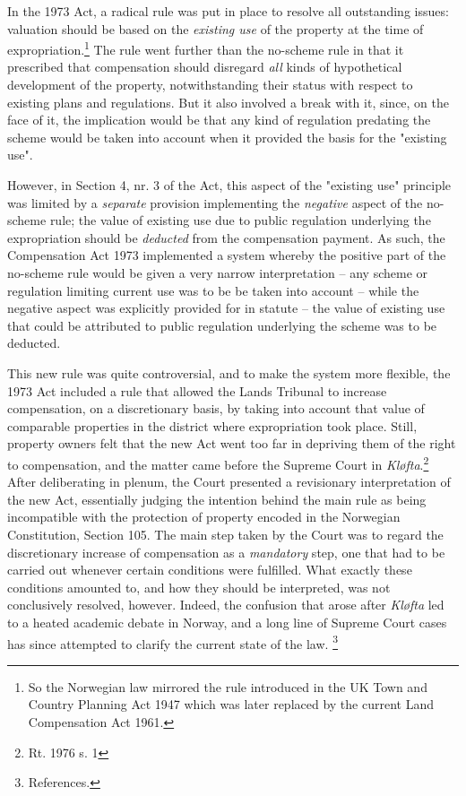 In the 1973 Act, a radical rule was put in place to resolve all outstanding issues: valuation should be based on the  \emph{existing use} of the property at the time of expropriation.\footnote{So the Norwegian law mirrored the rule introduced in the UK Town and Country Planning Act 1947 which was later replaced by the current Land Compensation Act 1961.} The rule went further than the no-scheme rule in that it prescribed that compensation should disregard \emph{all} kinds of hypothetical development of the property, notwithstanding their status with respect to existing plans and regulations. But it also involved a break with it, since, on the face of it, the implication would be that any kind of regulation predating the scheme would be taken into account when it provided the basis for the "existing use".

However, in Section 4, nr. 3 of the Act, this aspect of the "existing use" principle was limited by a \emph{separate} provision implementing the \emph{negative} aspect of the no-scheme rule; the value of existing use due to public regulation underlying the expropriation should be \emph{deducted} from the compensation payment. As such, the Compensation Act 1973 implemented a system whereby the positive part of the no-scheme rule would be given a very narrow interpretation -- any scheme or regulation limiting current use was to be be taken into account -- while the negative aspect was explicitly provided for in statute -- the value of existing use that could be attributed to public regulation underlying the scheme was to be deducted.

This new rule was quite controversial, and to make the system more flexible, the 1973 Act included a rule that allowed the Lands Tribunal to increase compensation, on a discretionary basis, by taking into account that value of comparable properties in the district where expropriation took place. Still, property owners felt that the new Act went too far in depriving them of the right to compensation, and the matter came before the Supreme Court in \emph{Kløfta}.\footnote{Rt. 1976 s. 1} After deliberating in plenum, the Court presented a revisionary interpretation of the new Act, essentially judging the intention behind the main rule as being incompatible with the protection of property encoded in the Norwegian Constitution, Section 105. The main step taken by the Court was to regard the discretionary increase of compensation as a \emph{mandatory} step, one that had to be carried out whenever certain conditions were fulfilled. What exactly these conditions amounted to, and how they should be interpreted, was not conclusively resolved, however. Indeed, the confusion that arose after \emph{Kløfta} led to a heated academic debate in Norway, and a long line of Supreme Court cases has since attempted to clarify the current state of the law. \footnote{References.}

